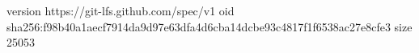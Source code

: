 version https://git-lfs.github.com/spec/v1
oid sha256:f98b40a1aecf7914da9d97e63dfa4d6cba14dcbe93c4817f1f6538ac27e8cfe3
size 25053
